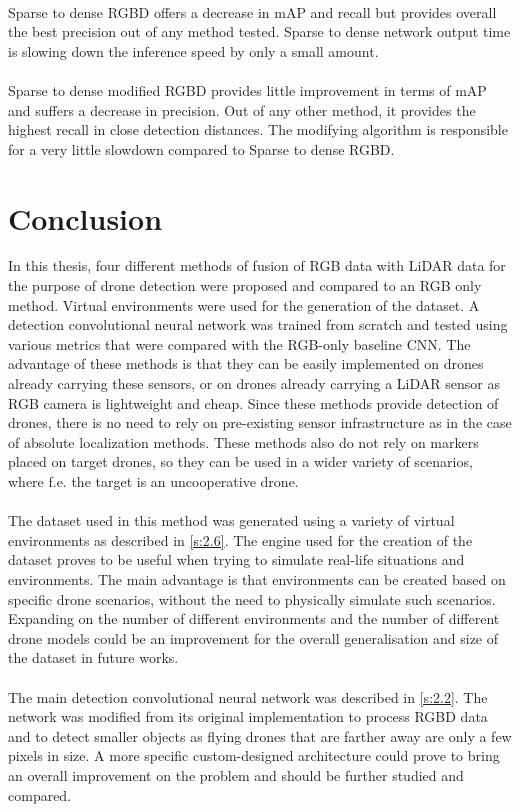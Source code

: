 \documentclass[twoside]{ctuthesis}
\theoremstyle{plain}
\theoremstyle{definition}
\theoremstyle{note}
\begin{document}
\\
Sparse to dense RGBD offers a decrease in mAP and recall but provides overall the best precision out of any method tested. Sparse to dense network output time is slowing down the inference speed by only a small amount.\\
\\
Sparse to dense modified RGBD provides little improvement in terms of mAP and suffers a decrease in precision. Out of any other method, it provides the highest recall in close detection distances. The modifying algorithm is responsible for a very little slowdown compared to Sparse to dense RGBD.
\chapter{Conclusion}
In this thesis, four different methods of fusion of RGB data with LiDAR data for the purpose of drone detection were proposed and compared to an RGB only method. Virtual environments were used for the generation of the dataset. A detection convolutional neural network was trained from scratch and tested using various metrics that were compared with the RGB-only baseline CNN. The advantage of these methods is that they can be easily implemented on drones already carrying these sensors, or on drones already carrying a LiDAR sensor as RGB camera is lightweight and cheap. Since these methods provide detection of drones, there is no need to rely on pre-existing sensor infrastructure as in the case of absolute localization methods. These methods also do not rely on markers placed on target drones, so they can be used in a wider variety of scenarios, where f.e. the target is an uncooperative drone.\\
\\
The dataset used in this method was generated using a variety of virtual environments as described in \autoref{s:2.6}. The engine used for the creation of the dataset proves to be useful when trying to simulate real-life situations and environments. The main advantage is that environments can be created based on specific drone scenarios, without the need to physically simulate such scenarios. Expanding on the number of different environments and the number of different drone models could be an improvement for the overall generalisation and size of the dataset in future works.\\
\\
The main detection convolutional neural network was described in \autoref{s:2.2}. The network was modified from its original implementation to process RGBD data and to detect smaller objects as flying drones that are farther away are only a few pixels in size. A more specific custom-designed architecture could prove to bring an overall improvement on the problem and should be further studied and compared.\\
\end{document}
